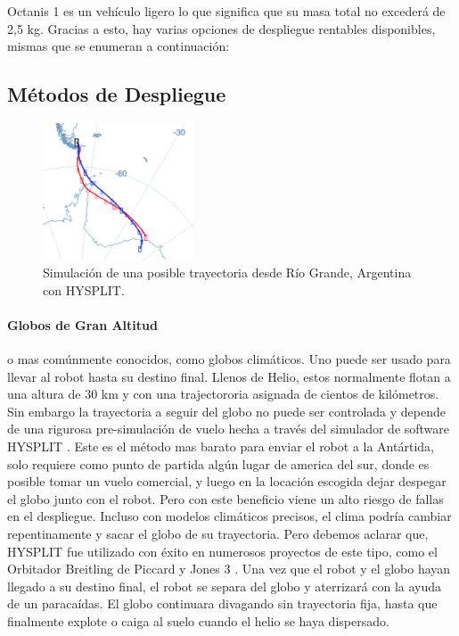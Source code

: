 \documentclass[a4paper,12pt]{article}
\begin{document}
Octanis 1 es un vehículo ligero lo que significa que su masa total no excederá de 2,5 kg. Gracias a esto, hay varias opciones de despliegue rentables disponibles, mismas que se enumeran a continuación:

\subsection{Métodos de Despliegue}

\begin{figure}[h!]
	\centering
    \includegraphics[width=0.4\textwidth]{trajectory}
    \caption{Simulación de una posible trayectoria desde Río Grande, Argentina con HYSPLIT.}
\end{figure}

\paragraph{Globos de Gran Altitud} o mas comúnmente conocidos, como globos climáticos. Uno puede ser usado para llevar al robot hasta su destino final. Llenos de Helio, estos normalmente flotan a una altura de 30 km y con una trajectororia asignada de cientos de kilómetros. Sin embargo la trayectoria a seguir del globo no puede ser controlada y depende de una rigurosa pre-simulación de vuelo hecha a través del simulador de software HYSPLIT  \cite{hysplit} \cite{hysplitjava}. Este es el método mas barato para enviar el robot a la Antártida, solo requiere como punto de partida algún lugar de america del sur, donde es posible tomar un vuelo comercial, y luego en la locación escogida dejar despegar el globo junto con el robot. Pero con este beneficio viene un alto riesgo de fallas en el despliegue. Incluso con modelos climáticos precisos, el clima podría cambiar repentinamente y sacar el globo de su trayectoria. Pero debemos aclarar que, HYSPLIT fue utilizado con éxito en numerosos proyectos de este tipo, como  el Orbitador Breitling de Piccard y Jones 3 \cite{hysplitexamples}.
Una vez que el robot y el globo hayan llegado a su destino final, el robot se separa del globo y aterrizará con la ayuda de un paracaídas. El globo continuara divagando sin trayectoria fija, hasta que finalmente explote o caiga al suelo cuando el helio se haya dispersado.
\end{document}
